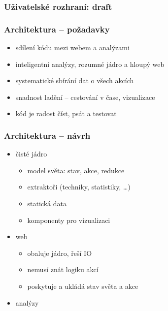 \documentclass[xcolor=dvipsnames, 14pt]{beamer}
\newcommand{\imageW}[1]{%
  \makebox[\textwidth][c]{\texttt{[image: img/\#1]}}}
\begin{document}
\begin{frame}
\frametitle{Uživatelské rozhraní: draft}
\imageW{new-user-interface-2.png}
\end{frame}


\begin{frame}
\frametitle{Architektura -- požadavky}
\begin{itemize}
\item sdílení kódu mezi webem a analýzami
\item inteligentní analýzy, rozumné jádro a hloupý web
\item systematické sbírání dat o všech akcích
\item snadnost ladění -- cestování v čase, vizualizace
\item kód je radost číst, psát a testovat %
\end{itemize}
\end{frame}

\begin{frame}
\frametitle{Architektura -- návrh}
\begin{itemize}
\item čisté jádro
  \begin{itemize}
  \item model světa: stav, akce, redukce
  \item extraktoři (techniky, statistiky, \ldots)
  \item statická data
  \item komponenty pro vizualizaci
  \end{itemize}
\item web  %
  \begin{itemize}
  \item obaluje jádro, řeší IO
  \item nemusí znát logiku akcí
  \item poskytuje a ukládá stav světa a akce
  \end{itemize}
\item analýzy
\end{itemize}
\end{frame}
\end{document}
